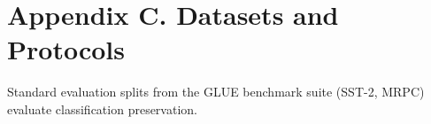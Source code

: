 \section*{Appendix C. Datasets and Protocols}
Standard evaluation splits from the GLUE benchmark suite (SST-2, MRPC) evaluate classification preservation.
